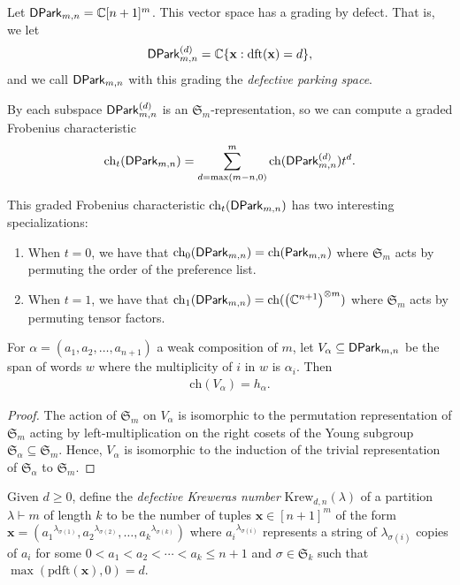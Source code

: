 \documentclass[11pt,reqno]{BICA}
\theoremstyle{definition}
\newcommand{\ch}{\mathrm{ch}}
\newcommand{\Krew}{\mathrm{Krew}}
\newcommand{\Park}{{{\sf Park}}}
\newcommand{\DPark}{{{\sf DPark}}}
\newcommand{\x}{\mathbf{x}}
\newcommand{\de}{\mathrm{dft}}
\newcommand{\pde}{\mathrm{pdft}}
\newcommand{\CC}{\mathbb{C}}
\begin{document}
\begin{definition}
    Let $\DPark_{m,n}=\CC [n+1]^m$. This vector space has a grading by defect. That is, we let \[\DPark_{m,n}^{(d)}=\CC\{\x:\de(\x)=d\},\] and we call $\DPark_{m,n}$ with this grading the \emph{defective parking space}.
\end{definition}

 By  each subspace $\DPark_{m,n}^{(d)}$ is an $\mathfrak{S}_m$-representation, so we can compute a graded Frobenius characteristic \[\ch_t(\DPark_{m,n})=\sum_{d=\max(m-n,0)}^{m}\ch(\DPark_{m,n}^{(d)})t^d.\] 

\begin{remark}
    This graded Frobenius characteristic $\ch_t(\DPark_{m,n})$ has two interesting specializations:
    \begin{enumerate}
        \item When $t=0$, we have that $\ch_0(\DPark_{m,n})=\ch(\Park_{m,n})$ where $\mathfrak{S}_m$ acts by permuting the order of the preference list.
        \item When $t=1$, we have that $\ch_1(\DPark_{m,n})=\ch(\left(\CC^{n+1}\right)^{\otimes m})$ where $\mathfrak{S}_m$ acts by permuting tensor factors.
    \end{enumerate}
\end{remark}

\begin{lemma}\label{lem:fixed_content_frob}
    For $\alpha=(a_1,a_2,\ldots,a_{n+1})$ a weak composition of $m$, let $V_\alpha\subseteq \DPark_{m,n}$ be the span of words $w$ where the multiplicity of $i$ in $w$ is $\alpha_i$. Then \begin{align*}
        \ch(V_\alpha)=h_\alpha.
    \end{align*}
\end{lemma}

\begin{proof}
    The action of $\mathfrak{S}_m$ on $V_\alpha$ is isomorphic to the permutation representation of $\mathfrak{S}_m$ acting by left-multiplication on the right cosets of the Young subgroup $\mathfrak{S}_\alpha\subseteq \mathfrak{S}_m$. Hence, $V_\alpha$ is isomorphic to the induction of the trivial representation of $\mathfrak{S}_\alpha$ to $\mathfrak{S}_m$.
\end{proof}

\begin{definition}\label{def:defkreweras}
    Given $d\geq0$, define the \emph{defective Kreweras number} $\Krew_{d,n}(\lambda)$ of a partition $\lambda\vdash m$ of length $k$ to be the number of tuples $\x\in[n+1]^m$ of the form $\x=({a_1}^{\lambda_{\sigma(1)}},{a_2}^{\lambda_{\sigma(2)}},\ldots,{a_k}^{\lambda_{\sigma(k)}})$ where ${a_i}^{\lambda_{\sigma(i)}}$ represents a string of $\lambda_{\sigma(i)}$ copies of $a_i$ for some $0<a_1<a_2<\cdots<a_k\leq n+1$ and $\sigma\in \mathfrak{S}_k$ such that $\max(\pde(\x),0)=d$.
\end{definition}
\end{document}
